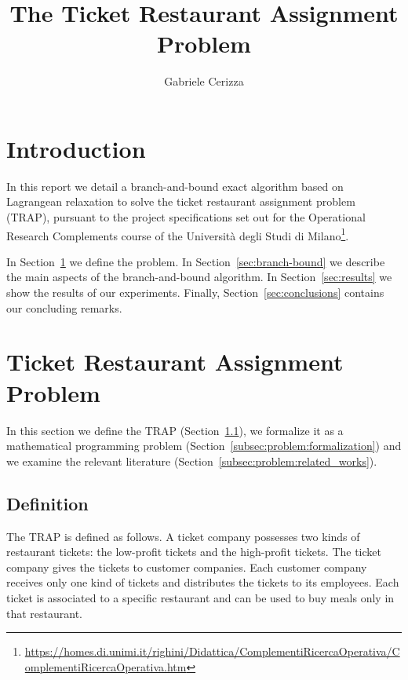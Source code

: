 \documentclass[runningheads]{llncs}
\begin{document}
\title{
  The Ticket Restaurant Assignment Problem
}
\author{Gabriele Cerizza}


\maketitle

\section*{Introduction}
\label{sec:introduction}

In this report we detail a branch-and-bound exact algorithm based on Lagrangean relaxation to solve the ticket restaurant assignment problem (TRAP), pursuant to the project specifications set out for the Operational Research Complements course of the Università degli Studi di Milano\footnote{\url{https://homes.di.unimi.it/righini/Didattica/ComplementiRicercaOperativa/ComplementiRicercaOperativa.htm}}. 

In Section~\ref{sec:problem} we define the problem. In Section~\ref{sec:branch-bound} we describe the main aspects of the branch-and-bound algorithm. In Section~\ref{sec:results} we show the results of our experiments. Finally, Section~\ref{sec:conclusions} contains our concluding remarks.

\section{Ticket Restaurant Assignment Problem}
\label{sec:problem}

In this section we define the TRAP (Section~\ref{subsec:problem:definition}), we formalize it as a mathematical programming problem (Section~\ref{subsec:problem:formalization}) and we examine the relevant literature (Section~\ref{subsec:problem:related_works}).

\subsection{Definition}
\label{subsec:problem:definition}

The TRAP is defined as follows. A ticket company possesses two kinds of restaurant tickets: the low-profit tickets and the high-profit tickets. The ticket company gives the tickets to customer companies. Each customer company receives only one kind of tickets and distributes the tickets to its employees. Each ticket is associated to a specific restaurant and can be used to buy meals only in that restaurant.
\end{document}
